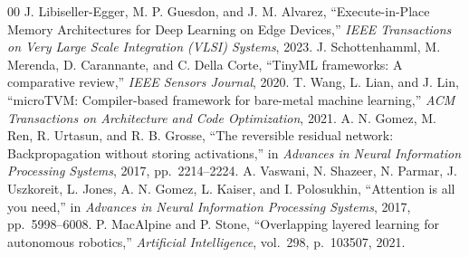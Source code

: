 \documentclass[conference]{IEEEtran}
\begin{document}
\begin{thebibliography}{00}
 J. Libiseller-Egger, M. P. Guesdon, and J. M. Alvarez, ``Execute-in-Place Memory Architectures for Deep Learning on Edge Devices,'' \textit{IEEE Transactions on Very Large Scale Integration (VLSI) Systems}, 2023.
 J. Schottenhamml, M. Merenda, D. Carannante, and C. Della Corte, ``TinyML frameworks: A comparative review,'' \textit{IEEE Sensors Journal}, 2020.
 T. Wang, L. Lian, and J. Lin, ``microTVM: Compiler-based framework for bare-metal machine learning,'' \textit{ACM Transactions on Architecture and Code Optimization}, 2021.
 A. N. Gomez, M. Ren, R. Urtasun, and R. B. Grosse, ``The reversible residual network: Backpropagation without storing activations,'' in \textit{Advances in Neural Information Processing Systems}, 2017, pp.~2214--2224.
 A. Vaswani, N. Shazeer, N. Parmar, J. Uszkoreit, L. Jones, A. N. Gomez, L. Kaiser, and I. Polosukhin, ``Attention is all you need,'' in \textit{Advances in Neural Information Processing Systems}, 2017, pp.~5998--6008.
 P. MacAlpine and P. Stone, ``Overlapping layered learning for autonomous robotics,'' \textit{Artificial Intelligence}, vol.~298, p.~103507, 2021.
\end{thebibliography}
\end{document}

